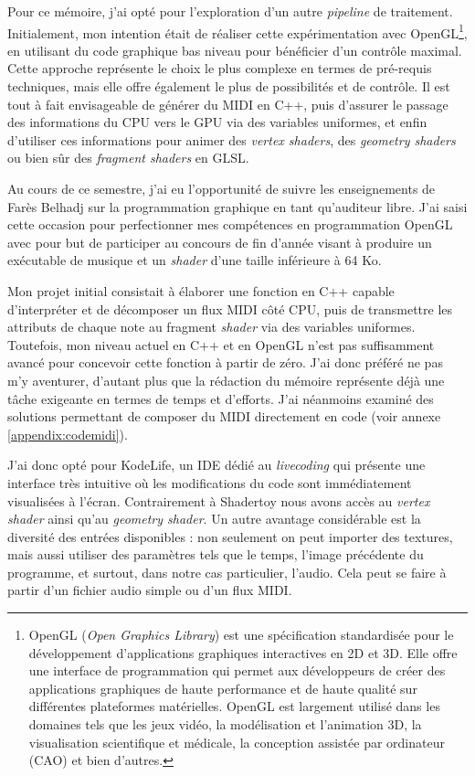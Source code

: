 Pour ce mémoire, j'ai opté pour l'exploration d'un autre \textit{pipeline} de traitement. Initialement, mon intention était de réaliser cette expérimentation avec OpenGL\footnote{OpenGL (\textit{Open Graphics Library}) est une spécification standardisée pour le développement d'applications graphiques interactives en 2D et 3D. Elle offre une interface de programmation qui permet aux développeurs de créer des applications graphiques de haute performance et de haute qualité sur différentes plateformes matérielles. OpenGL est largement utilisé dans les domaines tels que les jeux vidéo, la modélisation et l'animation 3D, la visualisation scientifique et médicale, la conception assistée par ordinateur (CAO) et bien d'autres.}, en utilisant du code graphique bas niveau pour bénéficier d'un contrôle maximal. Cette approche représente le choix le plus complexe en termes de pré-requis techniques, mais elle offre également le plus de possibilités et de contrôle. Il est tout à fait envisageable de générer du MIDI en C++, puis d'assurer le passage des informations du CPU vers le GPU via des variables uniformes, et enfin d'utiliser ces informations pour animer des \textit{vertex shaders}, des \textit{geometry shaders} ou bien sûr des \textit{fragment shaders} en GLSL.

Au cours de ce semestre, j'ai eu l'opportunité de suivre les enseignements de Farès Belhadj sur la programmation graphique en tant qu'auditeur libre. J'ai saisi cette occasion pour perfectionner mes compétences en programmation OpenGL avec pour but de participer au concours de fin d'année visant à produire un exécutable de musique et un \textit{shader} d'une taille inférieure à 64 Ko. 

Mon projet initial consistait à élaborer une fonction en C++ capable d'interpréter et de décomposer un flux MIDI côté CPU, puis de transmettre les attributs de chaque note au fragment \textit{shader} via des variables uniformes. Toutefois, mon niveau actuel en C++ et en OpenGL n'est pas suffisamment avancé pour concevoir cette fonction à partir de zéro. J'ai donc préféré ne pas m'y aventurer, d'autant plus que la rédaction du mémoire représente déjà une tâche exigeante en termes de temps et d'efforts. J'ai néanmoins examiné des solutions permettant de composer du MIDI directement en code (voir annexe \ref{appendix:codemidi}).


J'ai donc opté pour KodeLife, un IDE dédié au \textit{livecoding} qui présente une interface très intuitive où les modifications du code sont immédiatement visualisées à l'écran. Contrairement à Shadertoy nous avons accès au \textit{vertex shader} ainsi qu'au \textit{geometry shader}. Un autre avantage considérable est la diversité des entrées disponibles : non seulement on peut importer des textures, mais aussi utiliser des paramètres tels que le temps, l'image précédente du programme, et surtout, dans notre cas particulier, l'audio. Cela peut se faire à partir d'un fichier audio simple ou d'un flux MIDI.

